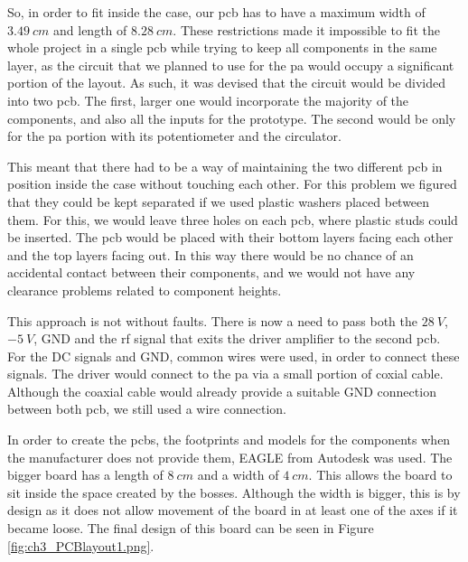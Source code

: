 \par So, in order to fit inside the case, our \ac{pcb} has to have a maximum width of $3.49 \:\si{cm}$ and length of $8.28 \:\si{cm}$. These restrictions made it impossible to fit the whole project in a single \ac{pcb} while trying to keep all components in the same layer, as the circuit that we planned to use for the \acl{pa} would occupy a significant portion of the layout. As such, it was devised that the circuit would be divided into two \ac{pcb}. The first, larger one would incorporate the majority of the components, and also all the inputs for the prototype. The second would be only for the \ac{pa} portion with its potentiometer and the circulator.

\par This meant that there had to be a way of maintaining the two different \ac{pcb} in position inside the case without touching each other. For this problem we figured that they could be kept separated if we used plastic washers placed between them. For this, we would leave three holes on each \ac{pcb}, where plastic studs could be inserted. The \ac{pcb} would be placed with their bottom layers facing each other and the top layers facing out. In this way there would be no chance of an accidental contact between their components, and we would not have any clearance problems related to component heights.

\par This approach is not without faults. There is now a need to pass both the $28\:\si{V}$, $-5\:\si{V}$, GND and the \ac{rf} signal that exits the driver amplifier to the second \ac{pcb}. For the DC signals and GND, common wires were used, in order to connect these signals. The driver would connect to the \ac{pa} via a small portion of coxial cable. Although the coaxial cable would already provide a suitable GND connection between both \ac{pcb}, we still used a wire connection.

\par In order to create the \ac{pcb}s, the footprints and models for the components when the manufacturer does not provide them, EAGLE from Autodesk was used. The bigger board has a length of $8\:\si{cm}$ and a width of $4\:\si{cm}$. This allows the board to sit inside the space created by the bosses. Although the width is bigger, this is by design as it does not allow movement of the board in at least one of the axes if it became loose. The final design of this board can be seen in Figure \ref{fig:ch3_PCBlayout1.png}.

